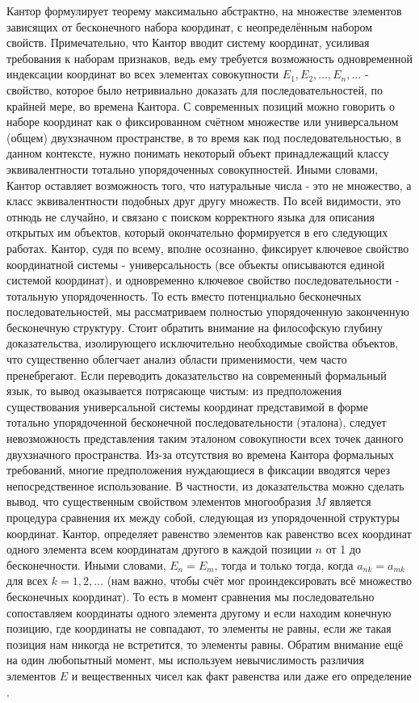 \documentclass[12pt]{article}
\begin{document}
Кантор формулирует теорему максимально абстрактно, на множестве элементов зависящих от бесконечного набора координат, с неопределённым набором свойств. Примечательно, что Кантор вводит систему координат, усиливая требования к наборам признаков, ведь ему требуется возможность одновременной индексации координат во всех элементах совокупности $E_1, E_2, \dots, E_n, \dots$ - свойство, которое было нетривиально доказать для последовательностей, по крайней мере, во времена Кантора. С современных позиций можно говорить о наборе координат как о фиксированном счётном множестве или универсальном (общем) двухзначном пространстве, в то время как под последовательностью, в данном контексте, нужно понимать некоторый объект принадлежащий классу эквивалентности тотально упорядоченных совокупностей. Иными словами, Кантор оставляет возможность того, что натуральные числа - это не множество, а класс эквивалентности подобных друг другу множеств. По всей видимости, это отнюдь не случайно, и связано с поиском корректного языка для описания открытых им объектов, который окончательно формируется в его следующих работах. Кантор, судя по всему, вполне осознанно, фиксирует ключевое свойство координатной системы - универсальность (все объекты описываются единой системой координат), и одновременно ключевое свойство последовательности - тотальную упорядоченность. То есть вместо потенциально бесконечных последовательностей, мы рассматриваем полностью упорядоченную законченную бесконечную структуру. Стоит обратить внимание на философскую глубину доказательства, изолирующего исключительно необходимые свойства объектов, что существенно облегчает анализ области применимости, чем часто пренебрегают. Если переводить доказательство на современный формальный язык, то вывод оказывается потрясающе чистым: из предположения существования универсальной системы координат представимой в форме тотально упорядоченной бесконечной последовательности (эталона), следует невозможность представления таким эталоном совокупности всех точек данного двухзначного пространства. Из-за отсутствия во времена Кантора формальных требований, многие предположения нуждающиеся в фиксации вводятся через непосредственное использование. В частности, из доказательства можно сделать вывод, что существенным свойством элементов многообразия $M$ является процедура сравнения их между собой, следующая из упорядоченной структуры координат. Кантор, определяет равенство элементов как равенство всех координат одного элемента всем координатам другого в каждой позиции $n$ от 1 до бесконечности. Иными словами, $E_n = E_m$, тогда и только тогда, когда $a_{nk} = a_{mk}$ для всех $k = 1, 2, \dots$ (нам важно, чтобы счёт мог проиндексировать всё множество бесконечных координат). То есть в момент сравнения мы последовательно сопоставляем координаты одного элемента другому и если находим конечную позицию, где координаты не совпадают, то элементы не равны, если же такая позиция нам никогда не встретится, то элементы равны. Обратим внимание ещё на один любопытный момент, мы используем невычислимость различия элементов $E$ и вещественных чисел как факт равенства или даже его определение \cite{compare-undecidable}. 
\end{document}
